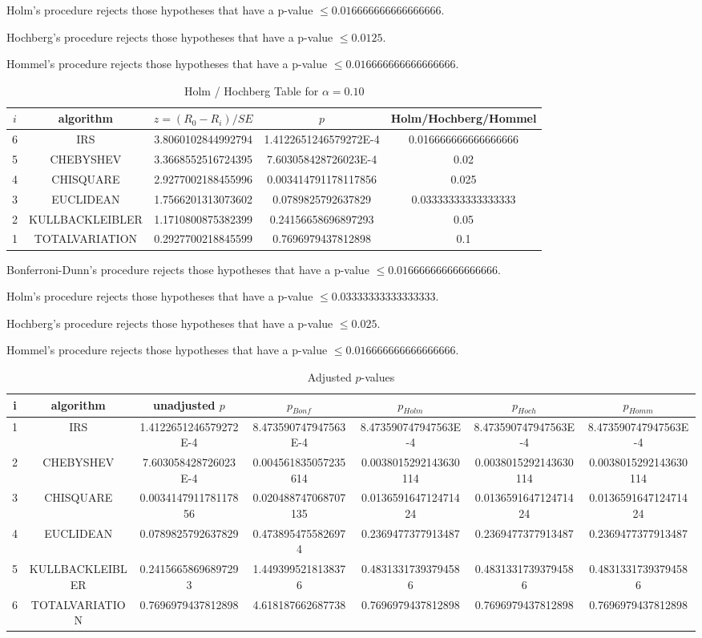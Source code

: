\documentclass[a4paper,10pt]{article}
\begin{document}
\begin{landscape}
Holm's procedure rejects those hypotheses that have a p-value $\le0.016666666666666666$.


Hochberg's procedure rejects those hypotheses that have a p-value $\le0.0125$.


Hommel's procedure rejects those hypotheses that have a p-value $\le0.016666666666666666$.


\begin{table}[!htp]
\centering\tiny
\caption{Holm / Hochberg Table for $\alpha=0.10$}
\begin{tabular}{ccccc}
$i$&algorithm&$z=(R_0 - R_i)/SE$&$p$&Holm/Hochberg/Hommel\\
\hline
6&IRS&3.8060102844992794&1.4122651246579272E-4&0.016666666666666666\\
5&CHEBYSHEV&3.3668552516724395&7.603058428726023E-4&0.02\\
4&CHISQUARE&2.9277002188455996&0.003414791178117856&0.025\\
3&EUCLIDEAN&1.7566201313073602&0.0789825792637829&0.03333333333333333\\
2&KULLBACKLEIBLER&1.1710800875382399&0.24156658696897293&0.05\\
1&TOTALVARIATION&0.2927700218845599&0.7696979437812898&0.1\\
\hline
\end{tabular}
\end{table}
Bonferroni-Dunn's procedure rejects those hypotheses that have a p-value $\le0.016666666666666666$.


Holm's procedure rejects those hypotheses that have a p-value $\le0.03333333333333333$.


Hochberg's procedure rejects those hypotheses that have a p-value $\le0.025$.


Hommel's procedure rejects those hypotheses that have a p-value $\le0.016666666666666666$.


\begin{table}[!htp]
\centering\tiny
\caption{Adjusted $p$-values}
\begin{tabular}{ccccccc}
i&algorithm&unadjusted $p$&$p_{Bonf}$&$p_{Holm}$&$p_{Hoch}$&$p_{Homm}$\\
\hline
1&IRS&1.4122651246579272E-4&8.473590747947563E-4&8.473590747947563E-4&8.473590747947563E-4&8.473590747947563E-4\\
2&CHEBYSHEV&7.603058428726023E-4&0.004561835057235614&0.0038015292143630114&0.0038015292143630114&0.0038015292143630114\\
3&CHISQUARE&0.003414791178117856&0.020488747068707135&0.013659164712471424&0.013659164712471424&0.013659164712471424\\
4&EUCLIDEAN&0.0789825792637829&0.4738954755826974&0.2369477377913487&0.2369477377913487&0.2369477377913487\\
5&KULLBACKLEIBLER&0.24156658696897293&1.4493995218138376&0.48313317393794586&0.48313317393794586&0.48313317393794586\\
6&TOTALVARIATION&0.7696979437812898&4.618187662687738&0.7696979437812898&0.7696979437812898&0.7696979437812898\\
\hline
\end{tabular}
\end{table}


\end{landscape}
\end{document}
